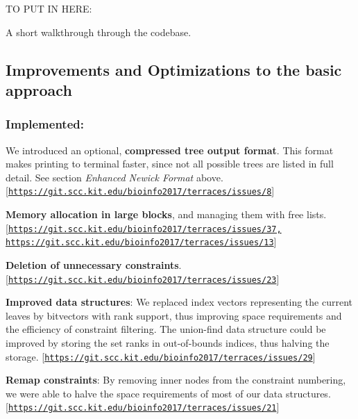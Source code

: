 TO P\+UT IN H\+E\+RE\+:
\begin{DoxyItemize}
\item A short walkthrough through the codebase.
\end{DoxyItemize}

\subsection*{Improvements and Optimizations to the basic approach}

\subsubsection*{Implemented\+:}


\begin{DoxyItemize}
\item We introduced an optional, {\bfseries compressed tree output format}. This format makes printing to terminal faster, since not all possible trees are listed in full detail. See section {\itshape Enhanced Newick Format} above. \mbox{[}\href{https://git.scc.kit.edu/bioinfo2017/terraces/issues/8}{\tt https\+://git.\+scc.\+kit.\+edu/bioinfo2017/terraces/issues/8}\mbox{]}
\item {\bfseries Memory allocation in large blocks}, and managing them with free lists. \mbox{[}\href{https://git.scc.kit.edu/bioinfo2017/terraces/issues/37,}{\tt https\+://git.\+scc.\+kit.\+edu/bioinfo2017/terraces/issues/37,} \href{https://git.scc.kit.edu/bioinfo2017/terraces/issues/13}{\tt https\+://git.\+scc.\+kit.\+edu/bioinfo2017/terraces/issues/13}\mbox{]}
\item {\bfseries Deletion of unnecessary constraints}. \mbox{[}\href{https://git.scc.kit.edu/bioinfo2017/terraces/issues/23}{\tt https\+://git.\+scc.\+kit.\+edu/bioinfo2017/terraces/issues/23}\mbox{]}
\item {\bfseries Improved data structures}\+: We replaced index vectors representing the current leaves by bitvectors with rank support, thus improving space requirements and the efficiency of constraint filtering. The union-\/find data structure could be improved by storing the set ranks in out-\/of-\/bounds indices, thus halving the storage. \mbox{[}\href{https://git.scc.kit.edu/bioinfo2017/terraces/issues/29}{\tt https\+://git.\+scc.\+kit.\+edu/bioinfo2017/terraces/issues/29}\mbox{]}
\item {\bfseries Remap constraints}\+: By removing inner nodes from the constraint numbering, we were able to halve the space requirements of most of our data structures. \mbox{[}\href{https://git.scc.kit.edu/bioinfo2017/terraces/issues/21}{\tt https\+://git.\+scc.\+kit.\+edu/bioinfo2017/terraces/issues/21}\mbox{]}

\end{DoxyItemize}
